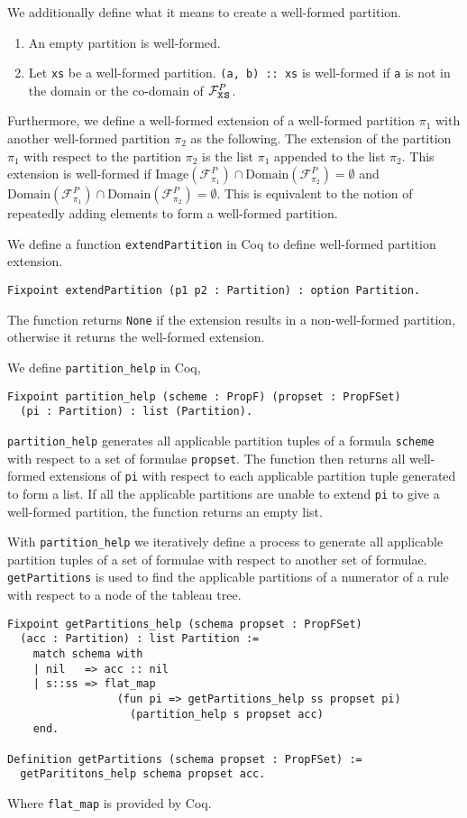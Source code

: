 \documentclass{llncs}
\begin{document}
We additionally define what it means to create a well-formed partition.
%
\begin{enumerate}
\item An empty partition is well-formed.
\item Let \verb+xs+ be a well-formed partition. \verb+(a, b) :: xs+ is
well-formed if \verb+a+ is not in the domain or the co-domain of
$\mathcal{F}^{P}_{\verb+xs+}$.
\end{enumerate}
%
Furthermore, we define a well-formed extension of a well-formed partition
$\pi_1$ with another well-formed partition $\pi_2$ as the following. The
extension of the partition $\pi_1$ with respect to the partition $\pi_2$ is
the list $\pi_1$ appended to the list $\pi_2$. This extension is well-formed
if $\textrm{Image}(\mathcal{F}^{P}_{\pi_1}) \cap
\textrm{Domain}(\mathcal{F}^{P}_{\pi_2}) = \emptyset$ and
$\textrm{Domain}(\mathcal{F}^{P}_{\pi_1}) \cap
\textrm{Domain}(\mathcal{F}^{P}_{\pi_2}) = \emptyset$. This is equivalent to
the notion of repeatedly adding elements to form a well-formed partition.

We define a function \verb+extendPartition+ in Coq to define well-formed
partition extension.
%
\begin{verbatim}
Fixpoint extendPartition (p1 p2 : Partition) : option Partition.
\end{verbatim}
%
The function returns \verb+None+ if the extension results in a non-well-formed
partition, otherwise it returns the well-formed extension.

We define \verb+partition_help+ in Coq,
%
\begin{verbatim}
Fixpoint partition_help (scheme : PropF) (propset : PropFSet)
  (pi : Partition) : list (Partition).
\end{verbatim}
%
\verb+partition_help+ generates all applicable partition tuples of a formula
\verb+scheme+ with respect to a set of formulae \verb+propset+.
The function then returns all well-formed extensions of \verb+pi+ with respect
to each applicable partition tuple generated to form a list.
If all the applicable partitions are unable to extend \verb+pi+ to give a
well-formed partition, the function returns an empty list.

With \verb+partition_help+ we iteratively define a process to generate all
applicable partition tuples of a set of formulae with respect to another set of
formulae. \verb+getPartitions+ is used to find the applicable partitions of a
numerator of a rule with respect to a node of the tableau tree.
%
\begin{verbatim}
Fixpoint getPartitions_help (schema propset : PropFSet)
  (acc : Partition) : list Partition :=
    match schema with
    | nil   => acc :: nil
    | s::ss => flat_map
                 (fun pi => getPartitions_help ss propset pi) 
                   (partition_help s propset acc)
    end.

Definition getPartitions (schema propset : PropFSet) :=
  getParititons_help schema propset acc.
\end{verbatim}
%
Where \verb+flat_map+ is provided by Coq.
%
\end{document}
